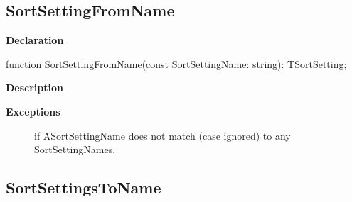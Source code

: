 \documentclass{report}
\newif\ifpdf
\begin{document}
\subsection*{SortSettingFromName}
\fi
\label{PasDoc_SortSettings-SortSettingFromName}
\begin{list}{}{
\setlength{\itemindent}{0cm}
\setlength{\listparindent}{0cm}
\setlength{\leftmargin}{\evensidemargin}
\addtolength{\leftmargin}{\tmplength}
\settowidth{\labelsep}{X}
\addtolength{\leftmargin}{\labelsep}
\setlength{\labelwidth}{\tmplength}
}
\item[\textbf{Declaration}\hfill]
\ifpdf
\begin{flushleft}
\fi
\begin{ttfamily}
function SortSettingFromName(const SortSettingName: string): TSortSetting;\end{ttfamily}

\ifpdf
\end{flushleft}
\fi

\par
\item[\textbf{Description}]
 \par
\item[\textbf{Exceptions}]
\begin{description}
\item[\begin{ttfamily}EInvalidSortSetting\end{ttfamily}(\ref{PasDoc_SortSettings.EInvalidSortSetting})] if ASortSettingName does not match (case ignored) to any SortSettingNames.
\end{description}


\end{list}
\ifpdf
\subsection*{\large{\textbf{SortSettingsToName}}\normalsize\hspace{1ex}\hrulefill}
\else
\end{document}
